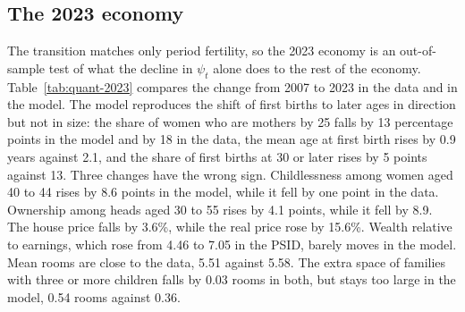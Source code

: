 \subsection{The 2023 economy}
\label{sec:quant-2023}

The transition matches only period fertility, so the 2023 economy is an
out-of-sample test of what the decline in $\psi_t$ alone does to the rest of
the economy. Table~\ref{tab:quant-2023} compares the change from 2007 to 2023
in the data and in the model. The model reproduces the shift of first births
to later ages in direction but not in size: the share of women who are
mothers by 25 falls by 13 percentage points in the model and by 18 in the
data, the mean age at first birth rises by 0.9 years against 2.1, and the
share of first births at 30 or later rises by 5 points against 13. Three
changes have the wrong sign. Childlessness among women aged 40 to 44 rises by
8.6 points in the model, while it fell by one point in the data. Ownership
among heads aged 30 to 55 rises by 4.1 points, while it fell by 8.9. The
house price falls by 3.6\%, while the real price rose by 15.6\%. Wealth
relative to earnings, which rose from 4.46 to 7.05 in the PSID, barely moves
in the model. Mean rooms are close to the data, 5.51 against 5.58. The extra
space of families with three or more children falls by 0.03 rooms in both,
but stays too large in the model, 0.54 rooms against 0.36.

